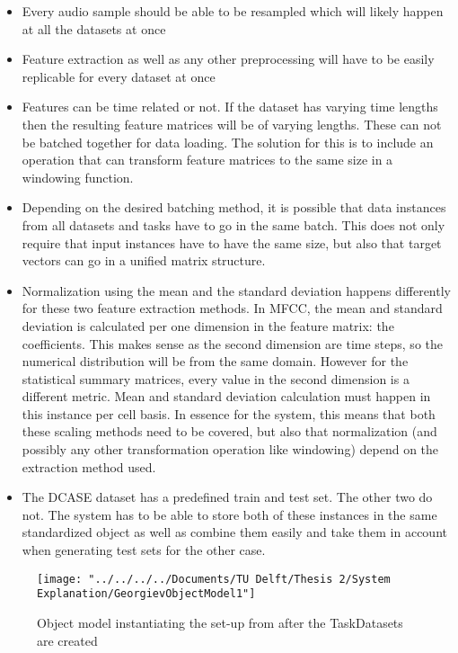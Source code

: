 \begin{itemize}
	\item Every audio sample should be able to be resampled which will likely happen at all the datasets at once
	\item Feature extraction as well as any other preprocessing will have to be easily replicable for every dataset at once
	\item Features can be time related or not. If the dataset has varying time lengths then the resulting feature matrices will be of varying lengths. These can not be batched together for data loading. The solution for this is to include an operation that can transform feature matrices to the same size in a windowing function. 
	\item Depending on the desired batching method, it is possible that data instances from all datasets and tasks have to go in the same batch. This does not only require that input instances have to have the same size, but also that target vectors can go in a unified matrix structure.
	\item Normalization using the mean and the standard deviation happens differently for these two feature extraction methods. In MFCC, the mean and standard deviation is calculated per one dimension in the feature matrix: the coefficients. This makes sense as the second dimension are time steps, so the numerical distribution will be from the same domain. However for the statistical summary matrices, every value in the second dimension is a different metric. Mean and standard deviation calculation must happen in this instance per cell basis. In essence for the system, this means that both these scaling methods need to be covered, but also that normalization (and possibly any other transformation operation like windowing) depend on the extraction method used.
	\item The DCASE dataset has a predefined train and test set. The other two do not. The system has to be able to store both of these instances in the same standardized object as well as combine them easily and take them in account when generating test sets for the other case.
\end{itemize}



\begin{figure}
	\centering
	\texttt{[image: "../../../../Documents/TU Delft/Thesis 2/System Explanation/GeorgievObjectModel1"]}
	\caption{Object model instantiating the set-up from \citet{georgiev2017low} after the TaskDatasets are created}
	\label{fig:georgievobjectmodel1}
\end{figure}

